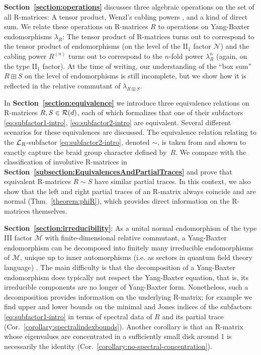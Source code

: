 \documentclass[12pt,a4paper]{amsart}
\numberwithin{equation}{section}
\theoremstyle{remark}
\newcommand{\la}{\lambda}
\newcommand{\CM}[0]{\mathcal{M}} \newcommand{\CN}[0]{\mathcal{N}}
\begin{document}
{\bf Section~\ref{section:operations}} discusses three algebraic operations on the set of all R-matrices: A tensor product, Wenzl's cabling powers \cite{Wenzl:1990}, and a kind of direct sum. We relate these operations on R-matrices $R$ to operations on Yang-Baxter endomorphisms $\la_R$: The tensor product of R-matrices turns out to correspond to the tensor product of endomorphisms (on the level of the II$_1$ factor $\CN$) and the cabling power $R^{(n)}$ turns out to correspond to the $n$-fold power $\la_R^n$ (again, on the type II$_1$ factor). At the time of writing, our understanding of the ``box sum'' $R\boxplus S$ on the level of endomorphisms is still incomplete, but we show how it is reflected in the relative commutant of $\la_{R\boxplus S}$.
    
In {\bf Section~\ref{section:equivalence}} we introduce three equivalence relations on R-matrices $R,S\in\mathcal{R}(d)$, each of which formalizes that one of their subfactors \eqref{eq:subfactor1-intro}, \eqref{eq:subfactor2-intro} are equivalent. Several different scenarios for these equivalences are discussed. 
The equivalence relation relating to the $\mathcal{L}_R$-subfactor \eqref{eq:subfactor2-intro}, denoted $\sim$, is taken from \cite{LechnerPennigWood:2019} and shown to exactly capture the braid group character defined by~$R$. We compare with the classification of involutive R-matrices in {\bf Section~\ref{subsection:EquivalencesAndPartialTraces}} and prove that equivalent R-matrices $R\sim S$ have similar partial traces. In this context, we also show that the left and right partial traces of an R-matrix always coincide and are normal (Thm.~\ref{theorem:phiR}), which provides direct information on the R-matrices themselves.

{\bf Section~\ref{section:irreducibility}}: As a unital normal endomorphism of the type III factor $\CM$ with finite-dimensional relative commutant, a Yang-Baxter endomorphism can be decomposed into finitely many irreducible endomorphisms of $\CM$, unique up to inner automorphisms (i.e. as sectors in quantum field theory language) \cite{Longo:1989,Longo:1991}. The main difficulty is that the decomposition of a Yang-Baxter endomorphism does typically not respect the Yang-Baxter equation, that is, its irreducible components are no longer of Yang-Baxter form. Nonetheless, such a decomposition provides information on the underlying R-matrix; for example we find upper and lower bounds on the minimal and Jones indices of the subfactors \eqref{eq:subfactor1-intro} in terms of spectral data of $R$ and its partial trace (Cor.~\ref{corollary:spectralindexbounds}). Another corollary is that an R-matrix whose eigenvalues are concentrated in a sufficiently small disk around 1 is necessarily the identity (Cor.~\ref{corollary:no-spectral-concentration}).
\end{document}
